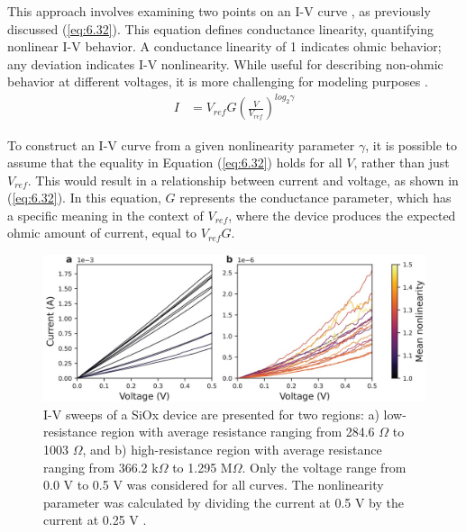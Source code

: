 \noindent This approach involves examining two points on an I-V curve \cite{lentz2013current}, as previously discussed (\ref{eq:6.32}). This equation defines conductance linearity, quantifying nonlinear I-V behavior. A conductance linearity of 1 indicates ohmic behavior; any deviation indicates I-V nonlinearity. While useful for describing non-ohmic behavior at different voltages, it is more challenging for modeling purposes \cite{sung2018effect}.
\begin{align}
I & = V_{ref}G\left ( \frac{V}{V_{ref}} \right )^{log_2 \gamma} \label{eq:6.36}
\end{align}


\noindent To construct an I-V curve from a given nonlinearity parameter $\gamma$, it is possible to assume that the equality in Equation (\ref{eq:6.32}) holds for all $V$, rather than just $V_{ref}$. This would result in a relationship between current and voltage, as shown in (\ref{eq:6.32}). In this equation, $G$ represents the conductance parameter, which has a specific meaning in the context of $V_{ref}$, where the device produces the expected ohmic amount of current, equal to $V_{ref} G$.\\

\begin{figure}[htbp!] 
\centering    
\includegraphics[width=1\textwidth]{Chapter6/Figs/h.png}
\caption[I-V sweeps of a SiOx device are presented for two regions]{I-V sweeps of a SiOx device are presented for two regions: a) low-resistance region with average resistance ranging from 284.6 $\Omega$ to 1003 $\Omega$, and b) high-resistance region with average resistance ranging from 366.2 k$\Omega$ to 1.295 M$\Omega$. Only the voltage range from 0.0 V to 0.5 V was considered for all curves. The nonlinearity parameter was calculated by dividing the current at 0.5 V by the current at 0.25 V \cite{joksas2022nonideality}.}
\label{fig:6h}
\end{figure}

